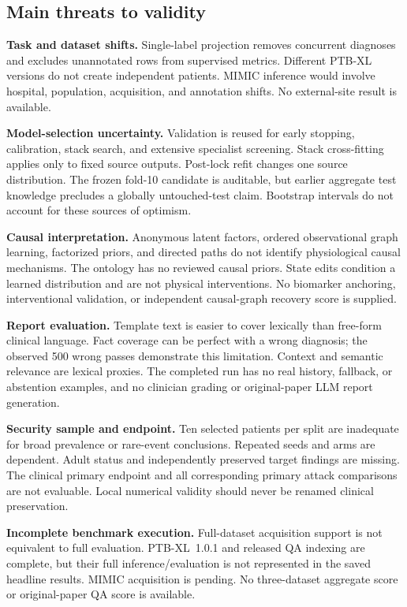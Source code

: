 \subsection{Main threats to validity}
\textbf{Task and dataset shifts.} Single-label projection removes concurrent diagnoses and excludes unannotated rows from supervised metrics. Different PTB-XL versions do not create independent patients. MIMIC inference would involve hospital, population, acquisition, and annotation shifts. No external-site result is available.

\textbf{Model-selection uncertainty.} Validation is reused for early stopping, calibration, stack search, and extensive specialist screening. Stack cross-fitting applies only to fixed source outputs. Post-lock refit changes one source distribution. The frozen fold-10 candidate is auditable, but earlier aggregate test knowledge precludes a globally untouched-test claim. Bootstrap intervals do not account for these sources of optimism.

\textbf{Causal interpretation.} Anonymous latent factors, ordered observational graph learning, factorized priors, and directed paths do not identify physiological causal mechanisms. The ontology has no reviewed causal priors. State edits condition a learned distribution and are not physical interventions. No biomarker anchoring, interventional validation, or independent causal-graph recovery score is supplied.

\textbf{Report evaluation.} Template text is easier to cover lexically than free-form clinical language. Fact coverage can be perfect with a wrong diagnosis; the observed 500 wrong passes demonstrate this limitation. Context and semantic relevance are lexical proxies. The completed run has no real history, fallback, or abstention examples, and no clinician grading or original-paper LLM report generation.

\textbf{Security sample and endpoint.} Ten selected patients per split are inadequate for broad prevalence or rare-event conclusions. Repeated seeds and arms are dependent. Adult status and independently preserved target findings are missing. The clinical primary endpoint and all corresponding primary attack comparisons are not evaluable. Local numerical validity should never be renamed clinical preservation.

\textbf{Incomplete benchmark execution.} Full-dataset acquisition support is not equivalent to full evaluation. PTB-XL~1.0.1 and released QA indexing are complete, but their full inference/evaluation is not represented in the saved headline results. MIMIC acquisition is pending. No three-dataset aggregate score or original-paper QA score is available.

